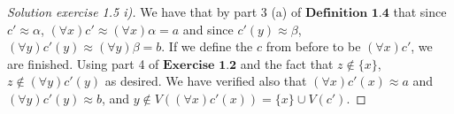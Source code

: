 \documentclass{article}
\theoremstyle{problemstyle}
\begin{document}
\begin{proof}[Solution exercise 1.5 i)]
We have that by part 3 (a) of $\textbf{Definition 1.4}$ that since $c' \approx \alpha$, $(\forall x)c' \approx (\forall x)\alpha = a$ and since $c'(y)\approx \beta$,  $(\forall y)c'(y)\approx (\forall y)\beta = b$. If we define the $c$ from before to be $(\forall x)c'$, we are finished. Using part 4 of $\textbf{Exercise 1.2}$ and the fact that $z \notin \{x\}$, $z \notin (\forall y)c'(y)$ as desired. We have verified also that $(\forall x)c'(x)\approx a$ and $(\forall y)c'(y)\approx b$, and $y \notin V((\forall x)c'(x)) = \{x\} \cup V(c')$. 

\end{proof}
\end{document}
